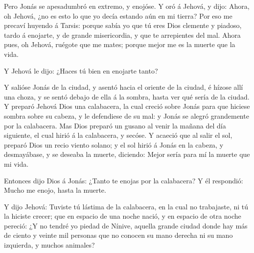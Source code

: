  Pero Jonás se apesadumbró en extremo, y enojóse.
 Y oró á Jehová, y dijo: Ahora, oh Jehová, ¿no es esto lo
que yo decía estando aún en mi tierra? Por eso me precaví huyendo á
Tarsis: porque sabía yo que tú eres Dios clemente y piadoso, tardo á
enojarte, y de grande misericordia, y que te arrepientes del mal.
 Ahora pues, oh Jehová, ruégote que me mates; porque mejor
me es la muerte que la vida.

 Y Jehová le dijo: ¿Haces tú bien en enojarte tanto?

 Y salióse Jonás de la ciudad, y asentó hacia el oriente de
la ciudad, é hízose allí una choza, y se sentó debajo de ella á la
sombra, hasta ver qué sería de la ciudad.  Y preparó Jehová
Dios una calabacera, la cual creció sobre Jonás para que hiciese sombra
sobre su cabeza, y le defendiese de su mal: y Jonás se alegró
grandemente por la calabacera.  Mas Dios preparó un gusano
al venir la mañana del día siguiente, el cual hirió á la calabacera, y
secóse.  Y acaeció que al salir el sol, preparó Dios un
recio viento solano; y el sol hirió á Jonás en la cabeza, y desmayábase,
y se deseaba la muerte, diciendo: Mejor sería para mí la muerte que mi
vida.

 Entonces dijo Dios á Jonás: ¿Tanto te enojas por la
calabacera? Y él respondió: Mucho me enojo, hasta la muerte.

 Y dijo Jehová: Tuviste tú lástima de la calabacera, en la
cual no trabajaste, ni tú la hiciste crecer; que en espacio de una noche
nació, y en espacio de otra noche pereció:  ¿Y no tendré yo
piedad de Nínive, aquella grande ciudad donde hay más de ciento y veinte
mil personas que no conocen su mano derecha ni su mano izquierda, y
muchos animales?
